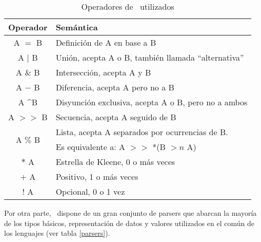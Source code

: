 \begin{table}[!ht]\centering\scriptsize
\begin{tabular}{| c | p{7cm} |}
\hline

\rowcolor{gris} \textbf{Operador} & \textbf{Semántica} \\ \hline

A $=$                  B  & Definición de A en base a B \\ \hline
A $|$                  B  & Unión, acepta A o B, también llamada ``alternativa''\\ \hline
A $\&$                 B  & Intersección, acepta A y B \\ \hline
A $-$                  B  & Diferencia, acepta A pero no a B  \\ \hline
A \textasciicircum     B  & Disyunción exclusiva, acepta A o B, pero no a ambos \\ \hline
A $>>$                 B  & Secuencia, acepta A seguido de B \\ \hline
\multirow{2}{*}{A $\%$ B} & Lista, acepta A separados por ocurrencias de B.\\
                          & Es equivalente a: A $>>$ *(B $>n$ A)\\ \hline
$*$                    A  & Estrella de Kleene, 0 o más veces \\ \hline
$+$                    A  & Positivo, 1 o más veces \\ \hline
$!$                    A  & Opcional, 0 o 1 vez \\ \hline
\end{tabular}
\caption{Operadores de \spirit\ utilizados}\label{ope_spirit}
\end{table}

Por otra parte, \spirit\ dispone de un gran conjunto de parsers que abarcan la mayoría de los tipos básicos, representación de datos y valores utilizados en el común de los lenguajes (ver tabla \ref{parsers}).

